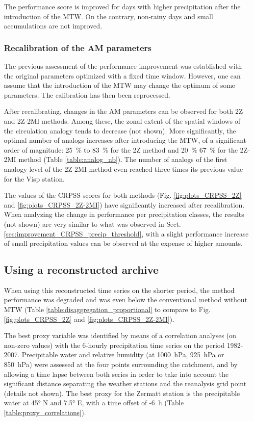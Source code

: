 \documentclass[hess, manuscript]{copernicus}
\begin{document}
The performance score is improved for days with higher precipitation after the introduction of the MTW. On the contrary, non-rainy days and small accumulations are not improved.


\subsubsection{Recalibration of the AM parameters}
\label{sec:recalibration}

The previous assessment of the performance improvement was established with the original parameters optimized with a fixed time window. However, one can assume that the introduction of the MTW may change the optimum of some parameters. The calibration has then been reprocessed.

After recalibrating, changes in the AM parameters can be observed for both 2Z and 2Z-2MI methods. Among these, the zonal extent of the spatial windows of the circulation analogy tends to decrease (not shown). More significantly, the optimal number of analogs increases after introducing the MTW, of a significant order of magnitude: 25~\% to 83~\% for the 2Z method and 20~\% 67~\% for the 2Z-2MI method (Table \ref{table:analog_nb}). The number of analogs of the first analogy level of the 2Z-2MI method even reached three times its previous value for the Visp station. 

The values of the CRPSS scores for both methods (Fig. \ref{fig:plots_CRPSS_2Z} and \ref{fig:plots_CRPSS_2Z-2MI}) have significantly increased after recalibration. When analyzing the change in performance per precipitation classes, the results (not shown) are very similar to what was observed in Sect. \ref{sec:improvement_CRPSS_precip_threshold}, with a slight performance increase of small precipitation values can be observed at the expense of higher amounts.


\subsection{Using a reconstructed archive}

When using this reconstructed time series on the shorter period, the method performance was degraded and was even below the conventional method without MTW (Table \ref{table:disaggregation_proportional} to compare to Fig. \ref{fig:plots_CRPSS_2Z} and \ref{fig:plots_CRPSS_2Z-2MI}).

The best proxy variable was identified by means of a correlation analyses (on non-zero values) with the 6-hourly precipitation time series on the period 1982-2007. Precipitable water and relative humidity (at 1000~hPa, 925~hPa or 850~hPa) were assessed at the four points surrounding the catchment, and by allowing a time lapse between both series in order to take into account the significant distance separating the weather stations and the reanalysis grid point (details not shown). The best proxy for the Zermatt station is the precipitable water at 45° N and 7.5° E, with a time offset of -6~h (Table \ref{table:proxy_correlations}).
\end{document}
